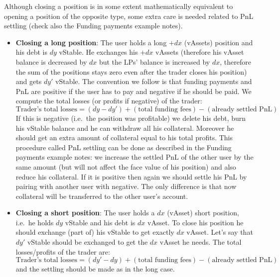 \documentclass{article}
\begin{document}
Although closing a position is in some extent mathematically equivalent to opening a
position of the opposite type, some extra care is needed related to PnL settling (check
also the Funding payments example notes).

\begin{itemize}

\item \textbf{Closing a long position}: The user holds a long $+dx$ (vAssets) position
      and his debt is $dy$ vStable. He exchanges his $+dx$ vAssets (therefore his vAsset
      balance is decreased by $dx$ but the LPs' balance is increased by $dx$, therefore
      the sum of the positions stays zero even after the trader closes his position) and
      gets $dy'$ vStable. The convention we follow is that funding payments and PnL are
      positive if the user has to pay and negative if he should be paid. We compute the
      total losses (or profits if negative) of the trader:
      \begin{equation}
      \text{Trader's total losses} = (dy - dy') + (\text{total funding fees}) - (\text{already settled PnL})
      \end{equation}
      If this is negative (i.e.\ the position was profitable) we delete his debt, burn his
      vStable balance and he can withdraw all his collateral. Moreover he should get an
      extra amount of collateral equal to his total profits. This procedure called PnL
      settling can be done as described in the Funding payments example notes: we increase
      the settled PnL of the other user by the same amount (but will not affect the face
      value of his position) and also reduce his collateral. If it is positive then again
      we should settle his PnL by pairing with another user with negative. The only
      difference is that now collateral will be transferred to the other user's account.

\item \textbf{Closing a short position}: The user holds a $dx$ (vAsset) short position,
      i.e.\ he holds $dy$ vStable and his debt is $dx$ vAsset. To close his position he
      should exchange (part of) his vStable to get exactly $dx$ vAsset. Let's say that
      $dy'$ vStable should be exchanged to get the $dx$ vAsset he needs. The total
      losses/profits of the trader are:
      \begin{equation}
      \text{Trader's total losses} = (dy' - dy) + (\text{total funding fees}) - (\text{already settled PnL})
      \end{equation}
      and the settling should be made as in the long case.

\end{itemize}
\end{document}
